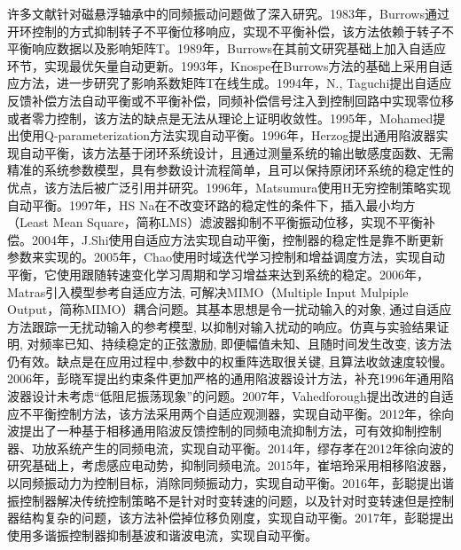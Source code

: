 \documentclass[
  lang=cn,
  degree=master,
  openany,oneside
]{nuaathesis}
\begin{document}
许多文献针对磁悬浮轴承中的同频振动问题做了深入研究。1983年，Burrows通过开环控制的方式抑制转子不平衡位移响应，实现不平衡补偿，该方法依赖于转子不平衡响应数据以及影响矩阵T\cite{burrows1983vibration}。1989年，Burrows在其前文研究基础上加入自适应环节，实现最优矢量自动更新\cite{burrows1989active}。1993年，Knospe在Burrows方法的基础上采用自适应方法，进一步研究了影响系数矩阵T在线生成\cite{knospe1993adaptive}。1994年，N., Taguchi提出自适应反馈补偿方法自动平衡或不平衡补偿，同频补偿信号注入到控制回路中实现零位移或者零力控制，该方法的缺点是无法从理论上证明收敛性\cite{taguchi1994unbalance}。1995年，Mohamed提出使用Q-parameterization方法实现自动平衡\cite{mohamed1995imbalance}。1996年，Herzog提出通用陷波器实现自动平衡，该方法基于闭环系统设计，且通过测量系统的输出敏感度函数、无需精准的系统参数模型，具有参数设计流程简单，且可以保持原闭环系统的稳定性的优点，该方法后被广泛引用并研究\cite{herzog1996unbalance}。1996年，Matsumura使用H无穷控制策略实现自动平衡\cite{matsumura1996application}。1997年，HS Na在不改变环路的稳定性的条件下，插入最小均方（Least Mean Square，简称LMS）滤波器抑制不平衡振动位移，实现不平衡补偿\cite{na1997adaptive}。2004年，J.Shi使用自适应方法实现自动平衡，控制器的稳定性是靠不断更新参数来实现的\cite{shi2004synchronous}。2005年，Chao使用时域迭代学习控制和增益调度方法，实现自动平衡，它使用跟随转速变化学习周期和学习增益来达到系统的稳定\cite{bi2005automatic}。2006年，Matras引入模型参考自适应方法, 可解决MIMO（Multiple Input Mulpiple Output，简称MIMO）耦合问题。其基本思想是令一扰动输入的对象, 通过自适应方法跟踪一无扰动输入的参考模型, 以抑制对输入扰动的响应。仿真与实验结果证明, 对频率已知、持续稳定的正弦激励, 即便幅值未知、且随时间发生改变, 该方法仍有效。缺点是在应用过程中,参数中的权重阵选取很关键, 且算法收敛速度较慢\cite{matras2006suppression}。2006年，彭晓军提出约束条件更加严格的通用陷波器设计方法\cite{彭晓军2006磁电轴承中抑制不平衡振动的陷波滤波器设计方法}，补充1996年通用陷波器设计未考虑“低阻尼振荡现象”的问题。2007年，Vahedforough提出改进的自适应不平衡控制方法，该方法采用两个自适应观测器，实现自动平衡\cite{vahedforough2007estimation}。2012年，徐向波提出了一种基于相移通用陷波反馈控制的同频电流抑制方法，可有效抑制控制器、功放系统产生的同频电流，实现自动平衡\cite{xu2012stability}。2014年，缪存孝在2012年徐向波的研究基础上，考虑感应电动势，抑制同频电流\cite{缪存孝2014含转子不平衡的磁轴承建模与同频电流抑制}。2015年，崔培玲采用相移陷波器，以同频振动力为控制目标，消除同频振动力，实现自动平衡\cite{崔培玲2015基于相移陷波器的磁轴承不平衡振动全频自适应控制}。2016年，彭聪提出谐振控制器解决传统控制策略不是针对时变转速的问题，以及针对时变转速但是控制器结构复杂的问题，该方法补偿掉位移负刚度，实现自动平衡\cite{peng2016synchronous}。2017年，彭聪提出使用多谐振控制器抑制基波和谐波电流，实现自动平衡\cite{peng2016frequency}。
\end{document}
